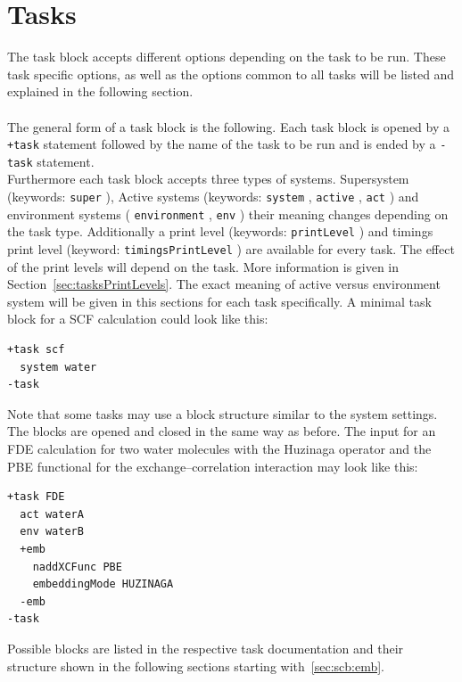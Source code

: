 \documentclass[bibliography=totocnumbered,a4paper,10pt,oneside]{scrbook}
\newcommand{\ttt}[1]{%
  \begingroup\setlength{\fboxsep}{1pt}%
  \colorbox{serenity-green!30}{\texttt{\hspace*{2pt}\vphantom{(g}#1\hspace*{2pt}}}%
  \endgroup
}
\begin{document}
\section{Tasks}
\label{sec:tasks}
The task block accepts different options depending on the task to be run.
These task specific options, as well as the options common to all tasks will be listed and explained
in the following section.\\
\\
The general form of a task block is the following.
Each task block is opened by a \ttt{+task} statement followed by the name of the
task to be run and is ended by a \ttt{-task} statement.\\
Furthermore each task block accepts three types of systems. Supersystem (keywords: \ttt{super}),
Active  systems (keywords: \ttt{system}, \ttt{active}, \ttt{act}) and environment systems
(\ttt{environment}, \ttt{env}) their meaning changes depending
on the task type. Additionally a print level (keywords: \ttt{printLevel}) and timings
print level (keyword: \ttt{timingsPrintLevel}) are available
for every task. The effect of the print levels will depend on the task. More information
is given in Section~\ref{sec:tasksPrintLevels}.
The exact meaning of active versus environment system will be given in this sections
for each task specifically.
A minimal task block for a SCF calculation could look like this:
\begin{lstlisting}
+task scf
  system water
-task
\end{lstlisting}
Note that some tasks may use a block structure similar to the system settings.
The blocks are opened and closed in the same way as before. The input for an
FDE calculation for two water molecules with the Huzinaga operator and the
PBE functional for the exchange--correlation interaction may look like this:
\begin{lstlisting}
+task FDE
  act waterA
  env waterB
  +emb
    naddXCFunc PBE
    embeddingMode HUZINAGA
  -emb
-task
\end{lstlisting}
Possible blocks are listed in the respective task documentation and their
structure shown in the following sections starting with~\ref{sec:scb:emb}.
\end{document}
